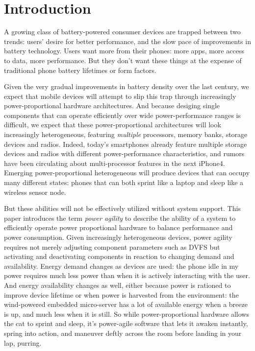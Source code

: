 \section{Introduction}

A growing class of battery-powered consumer devices are trapped between two
trends: users' desire for better performance, and the slow pace of
improvements in battery technology. Users want more from their phones: more
apps, more access to data, more performance. But they don't want these things
at the expense of traditional phone battery lifetimes or form factors.

Given the very gradual improvements in battery density over the last century,
we expect that mobile devices will attempt to slip this trap through
increasingly power-proportional hardware architectures. And because desiging
single components that can operate efficiently over wide power-performance
ranges is difficult, we expect that these power-proportional architectures
will look increasingly heterogeneous, featuring \textit{multiple} processors,
memory banks, storage devices and radios. Indeed, today's smartphones already
feature multiple storage devices and radios with different power-performance
characteristics, and rumors have been circulating about multi-processor
features in the next iPhone4. Emerging power-proportional heterogeneous will
produce devices that can occupy many different states: phones that can both
sprint like a laptop and sleep like a wireless sensor node.

But these abilities will not be effectively utilized without system support.
This paper introduces the term \textit{power agility} to describe the ability
of a system to efficiently operate power proportional hardware to balance
performance and power consumption. Given increasingly heterogeneous devices,
power agility requires not merely adjusting component parameters such as DVFS
but activating and deactivating components in reaction to changing demand and
availability. Energy demand changes as devices are used: the phone idle in my
power requires much less power than when it is actively interacting with the
user. And energy availability changes as well, either because power is
rationed to improve device lifetime or when power is harvested from the
environment: the wind-powered embedded micro-server has a lot of available
energy when a breeze is up, and much less when it is still. So while
power-proportional hardware allows the cat to sprint and sleep, it's
power-agile software that lets it awaken instantly, spring into action, and
maneuver deftly across the room before landing in your lap, purring.

